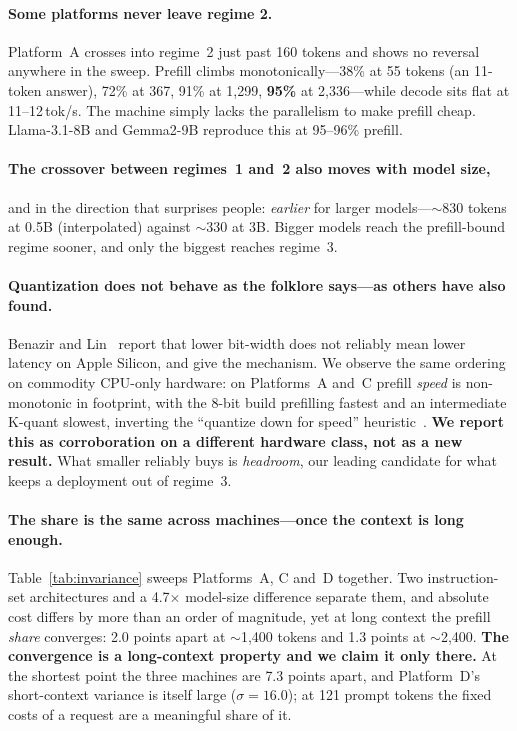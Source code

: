 \documentclass[sigconf,nonacm,10pt]{acmart}
\begin{document}
\paragraph{Some platforms never leave regime 2.} Platform~A crosses into regime~2 just past 160 tokens and shows no
reversal anywhere in the sweep. Prefill climbs monotonically---38\% at 55 tokens (an 11-token answer), 72\% at
367, 91\% at 1{,}299, \textbf{95\%} at 2{,}336---while decode sits flat at 11--12\,tok/s. The machine simply
lacks the parallelism to make prefill cheap. Llama-3.1-8B and Gemma2-9B reproduce this at
95--96\% prefill.

\paragraph{The crossover between regimes~1 and~2 also moves with model size,} and in the direction that
surprises people: \emph{earlier} for larger models---$\sim$830 tokens at 0.5B (interpolated) against
$\sim$330 at 3B. Bigger models reach the prefill-bound regime sooner, and only the biggest reaches regime~3.

\paragraph{Quantization does not behave as the folklore says---as others have also found.} Benazir and
Lin~\cite{benazir2025applequant} report that lower bit-width does not reliably mean lower latency on Apple
Silicon, and give the mechanism. We observe the same ordering on commodity CPU-only hardware: on Platforms~A
and~C prefill \emph{speed} is non-monotonic in footprint, with the 8-bit build prefilling fastest and an intermediate
K-quant slowest, inverting the ``quantize down for speed''
heuristic~\cite{dettmers2022llmint8,frantar2023gptq,lin2024awq}. \textbf{We report this as corroboration on a
different hardware class, not as a new result.} What smaller reliably buys is \emph{headroom}, our leading
candidate for what keeps a deployment out of regime~3.

\paragraph{The share is the same across machines---once the context is long enough.}
Table~\ref{tab:invariance} sweeps Platforms~A, C and~D together. Two instruction-set architectures and a
4.7$\times$ model-size difference separate them, and absolute cost differs by more than an order of magnitude,
yet at long context the prefill \emph{share} converges: 2.0 points apart at $\sim$1{,}400 tokens and 1.3 points
at $\sim$2{,}400. \textbf{The convergence is a long-context property and we claim it only there.} At the
shortest point the three machines are 7.3 points apart, and Platform~D's short-context variance is itself
large ($\sigma=16.0$); at 121 prompt tokens the fixed costs of a request are a meaningful share of it.
\end{document}
